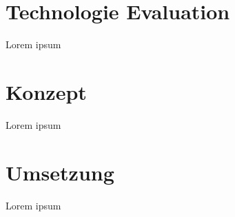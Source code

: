 

\section{Technologie Evaluation}

Lorem ipsum
\clearpage

\section{Konzept}

Lorem ipsum
\clearpage

\section{Umsetzung}

Lorem ipsum
\clearpage
